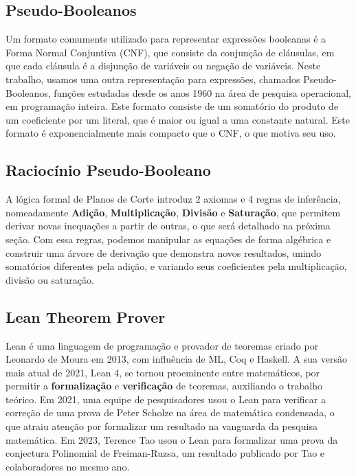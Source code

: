 \documentclass[conference]{IEEEtran}
\begin{document}
\subsection{Pseudo-Booleanos}
Um formato comumente utilizado para representar expressões booleanas é a Forma Normal Conjuntiva (CNF), que
consiste da conjunção de cláusulas, em que cada cláusula é a disjunção de variáveis ou negação de variáveis\cite{CNF}.
Neste trabalho, usamos uma outra representação para expressões, chamados Pseudo-Booleanos, funções estudadas
desde os anos 1960 na área de pesquisa operacional, em programação inteira. Este formato consiste de um somatório
do produto de um coeficiente por um literal, que é maior ou igual a uma constante natural.
Este formato é exponencialmente mais compacto que o CNF, o que motiva seu uso\cite{PBSolve}.

\subsection{Raciocínio Pseudo-Booleano}
A lógica formal de Planos de Corte introduz 2 axiomas e 4 regras de inferência, nomeadamente
\textbf{Adição}, \textbf{Multiplicação}, \textbf{Divisão} e \textbf{Saturação},
que permitem derivar novas inequações a partir de outras\cite{CutPlane},
o que será detalhado na próxima seção. Com essa regras, podemos manipular as equações
de forma algébrica e construir uma árvore de derivação que demonstra novos resultados,
unindo somatórios diferentes pela adição, e variando seus coeficientes pela multiplicação,
divisão ou saturação.

\subsection{Lean Theorem Prover}
Lean é uma linguagem de programação e provador de teoremas criado por Leonardo de Moura em 2013\cite{LeanProver}, com
influência de ML, Coq e Haskell.
A sua versão mais atual de 2021, Lean 4\cite{Lean4}, se tornou proeminente entre matemáticos, por permitir a
\textbf{formalização} e \textbf{verificação} de teoremas, auxiliando o trabalho teórico.
Em 2021, uma equipe de pesquisadores usou o Lean para verificar a correção de uma prova de Peter Scholze na área
de matemática condensada\cite{LTE}, o que atraiu atenção por formalizar um resultado na vanguarda da pesquisa matemática.
Em 2023, Terence Tao usou o Lean para formalizar uma prova da conjectura Polinomial de Freiman-Ruzsa\cite{PFR},
um resultado publicado por Tao e colaboradores no mesmo ano.
\end{document}
